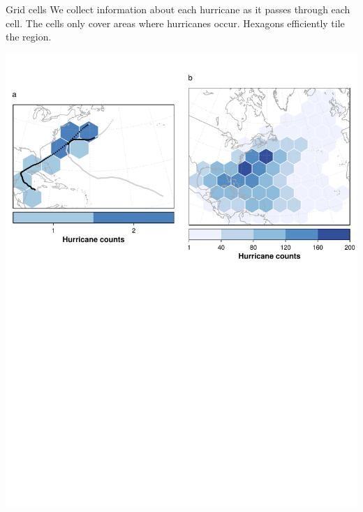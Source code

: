 \documentclass[handout]{beamer}
\begin{document}
\begin{frame}{Grid cells}
We collect information about each hurricane as it passes through each cell. The cells only cover  areas where hurricanes occur. Hexagons efficiently tile the region.
\vspace{-.5cm}
\begin{center}
\includegraphics[scale=.51]{figures/TracksToGrids00.pdf}\\
\end{center}
\end{frame}
\end{document}
